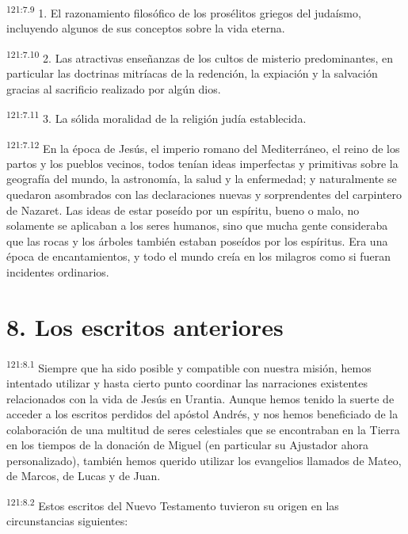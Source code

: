 \par 
\textsuperscript{121:7.9} 1. El razonamiento filosófico de los prosélitos griegos del judaísmo, incluyendo algunos de sus conceptos sobre la vida eterna.

\par 
\textsuperscript{121:7.10} 2. Las atractivas enseñanzas de los cultos de misterio predominantes, en particular las doctrinas mitríacas de la redención, la expiación y la salvación gracias al sacrificio realizado por algún dios.

\par 
\textsuperscript{121:7.11} 3. La sólida moralidad de la religión judía establecida.

\par 
\textsuperscript{121:7.12} En la época de Jesús, el imperio romano del Mediterráneo, el reino de los partos y los pueblos vecinos, todos tenían ideas imperfectas y primitivas sobre la geografía del mundo, la astronomía, la salud y la enfermedad; y naturalmente se quedaron asombrados con las declaraciones nuevas y sorprendentes del carpintero de Nazaret. Las ideas de estar poseído por un espíritu, bueno o malo, no solamente se aplicaban a los seres humanos, sino que mucha gente consideraba que las rocas y los árboles también estaban poseídos por los espíritus. Era una época de encantamientos, y todo el mundo creía en los milagros como si fueran incidentes ordinarios.

\section*{8. Los escritos anteriores}
\par 
\textsuperscript{121:8.1} Siempre que ha sido posible y compatible con nuestra misión, hemos intentado utilizar y hasta cierto punto coordinar las narraciones existentes relacionados con la vida de Jesús en Urantia. Aunque hemos tenido la suerte de acceder a los escritos perdidos del apóstol Andrés, y nos hemos beneficiado de la colaboración de una multitud de seres celestiales que se encontraban en la Tierra en los tiempos de la donación de Miguel (en particular su Ajustador ahora personalizado), también hemos querido utilizar los evangelios llamados de Mateo, de Marcos, de Lucas y de Juan.

\par 
\textsuperscript{121:8.2} Estos escritos del Nuevo Testamento tuvieron su origen en las circunstancias siguientes:

